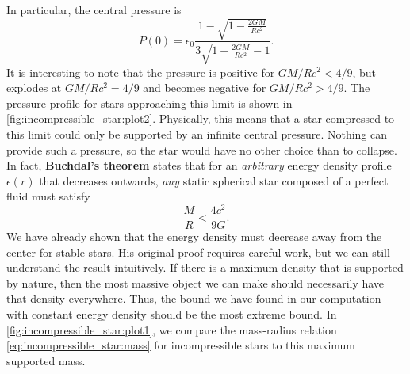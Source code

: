 In particular, the central pressure is
\begin{equation}
	P(0) = \epsilon_0 \frac{1 - \sqrt{1 - \frac{2GM}{Rc^2}}}{3 \sqrt{1-\frac{2GM}{Rc^2}} - 1} .
	\label{eq:incompressible_star:central_pressure}
\end{equation}
It is interesting to note that the pressure is positive for $GM/Rc^2 < 4/9$, but explodes at $GM/Rc^2 = 4/9$ and becomes negative for $GM/Rc^2 > 4/9$.
The pressure profile for stars approaching this limit is shown in \cref{fig:incompressible_star:plot2}.
Physically, this means that a star compressed to this limit could only be supported by an infinite central pressure.
Nothing can provide such a pressure, so the star would have no other choice than to collapse.
In fact, \textbf{Buchdal's theorem} states that for an \emph{arbitrary} energy density profile $\epsilon(r)$ that decreases outwards, \emph{any} static spherical star composed of a perfect fluid must satisfy
\cite{ref:buchdal}
\begin{equation}
	\frac{M}{R} < \frac{4c^2}{9G} .
	\label{eq:incompressible_star:buchdal}
\end{equation}
We have already shown that the energy density must decrease away from the center for stable stars.
His original proof requires careful work, but we can still understand the result intuitively.
If there is a maximum density that is supported by nature, then the most massive object we can make should necessarily have that density everywhere.
Thus, the bound we have found in our computation with constant energy density should be the most extreme bound.
In \cref{fig:incompressible_star:plot1}, we compare the mass-radius relation \eqref{eq:incompressible_star:mass} for incompressible stars to this maximum supported mass.

